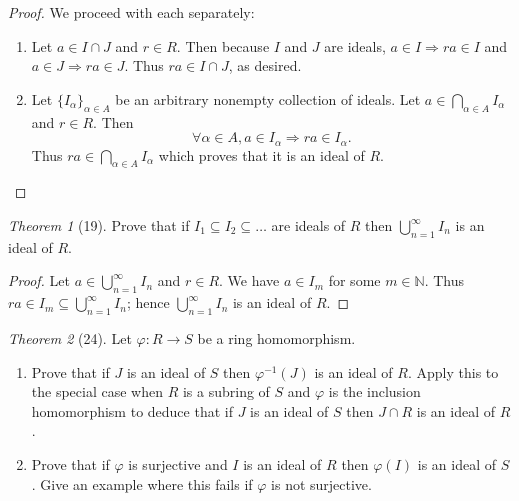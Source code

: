 \documentclass[12pt]{article}
\theoremstyle{remark}
\theoremstyle{named}
\newtheorem*{theorem}{Theorem}
\renewcommand{\a}{\alpha}
\begin{document}
\begin{proof}
    We proceed with each separately:
    \begin{enumerate}
        \item Let \(a \in I \cap J\) and \(r \in R\). Then because \(I\) and \(J\) are ideals, \(a \in I \Rightarrow ra \in I\) and \(a \in J \Rightarrow ra \in J\). Thus \(ra \in I \cap J\), as desired.
        \item Let \(\{I_\a\}_{\a \in A}\) be an arbitrary nonempty collection of ideals. Let \(a \in \bigcap_{\a \in A} I_\a\) and \(r \in R\). Then 
        \[\forall \a \in A, a \in I_\a \Rightarrow ra \in I_\a.\] 
        Thus \(ra \in \bigcap_{\a \in A}I_\a\) which proves that it is an ideal of \(R\). 
    \end{enumerate}
\end{proof}


\begin{theorem}[19]
    Prove that if \(I_1 \subseteq I_2 \subseteq \dots\) are ideals of \(R\) then \(\bigcup_{n = 1}^\infty I_n\) is an ideal of \(R\).
\end{theorem}

\begin{proof}
    Let \(a \in \bigcup_{n = 1}^\infty I_n\) and \(r \in R\). We have \(a \in I_m\) for some \(m \in \mathbb N\). Thus \(ra \in I_m \subseteq \bigcup_{n = 1}^\infty I_n\); hence \(\bigcup_{n = 1}^\infty I_n\) is an ideal of \(R\).
\end{proof}


\begin{theorem}[24]
    Let \(\varphi : R \to S\) be a ring homomorphism.
    \begin{enumerate}
        \item Prove that if \(J\) is an ideal of \(S\) then \(\varphi^{-1}(J)\) is an ideal of \(R\). Apply this to the special case when \(R\) is a subring of \(S\) and \(\varphi\) is the inclusion homomorphism to deduce that if \(J\) is an ideal of \(S\) then \(J \cap R\) is an ideal of \(R\). 
        \item Prove that if \(\varphi\) is surjective and \(I\) is an ideal of \(R\) then \(\varphi(I)\) is an ideal of \(S\). Give an example where this fails if \(\varphi\) is not surjective.
    \end{enumerate}
\end{theorem}
\end{document}
